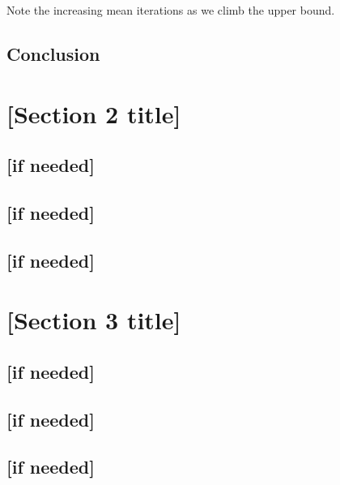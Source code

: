 \documentclass[11pt]{article}
\begin{document}
	Note the increasing mean iterations as we climb the upper bound.
	
	\subsection{Conclusion}
\newpage
	
\section{[Section 2 title]}
	\subsection{[if needed]}
	\subsection{[if needed]}
	\subsection{[if needed]}

\newpage

\section{[Section 3 title]}
	\subsection{[if needed]}
	\subsection{[if needed]}
	\subsection{[if needed]}
\end{document}
